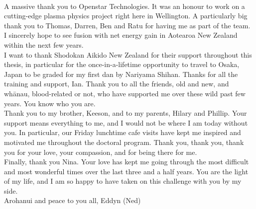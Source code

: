 \\[5pt] A massive thank you to Openstar Technologies. It was an honour to work on a cutting-edge plasma physics project right here in Wellington. A particularly big thank you to Thomas, Darren, Ben and Ratu for having me as part of the team. I sincerely hope to see fusion with net energy gain in Aotearoa New Zealand within the next few years. \\[5pt] I want to thank Shodokan Aikido New Zealand for their support throughout this thesis, in particular for the once-in-a-lifetime opportunity to travel to Osaka, Japan to be graded for my first dan by Nariyama Shihan. Thanks for all the training and support, Ian. Thank you to all the friends, old and new, and whānau, blood-related or not, who have supported me over these wild past few years. You know who you are. \\[5pt] Thank you to my brother, Keeson, and to my parents, Hilary and Phillip. Your support means everything to me, and I would not be where I am today without you. In particular, our Friday lunchtime cafe visits have kept me inspired and motivated me throughout the doctoral program. Thank you, thank you, thank you for your love, your compassion, and for being there for me. \\[5pt] Finally, thank you Nina. Your love has kept me going through the most difficult and most wonderful times over the last three and a half years. You are the light of my life, and I am so happy to have taken on this challenge with you by my side. \\[5pt] Arohanui and peace to you all, Eddyn (Ned)

\clearpage
\newpage
\thispagestyle{empty} %
\mbox{~}
\clearpage
\newpage

\pagestyle{headings}


